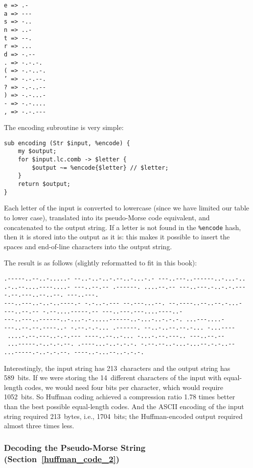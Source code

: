 \begin{verbatim}
e => .-
a => ---
s => -..
n => ..-
t => --.
r => ...
d => -.--
. => -.-.-.
( => -.-..-.
’ => -.-.--.
? => -.-..--
) => -.-...-
- => -.-....
, => -.-.---
\end{verbatim}

The encoding subroutine is very simple:

\begin{verbatim}
sub encoding (Str $input, %encode) {
    my $output;
    for $input.lc.comb -> $letter {
        $output ~= %encode{$letter} // $letter;
    }
    return $output;
}
\end{verbatim}

Each letter of the input is converted to lowercase (since we have 
limited our table to lower case), translated into its pseudo-Morse 
code equivalent, and concatenated to the output string. If a letter
is not found in the \verb'%encode' hash, then it is stored into 
the output as it is: this makes it possible to insert the spaces 
and end-of-line characters into the output string.

The result is as follows (slightly reformatted to fit in this book):
\begin{verbatim}
.-----..--..-.....- --..-..-..-.--..-...-.- ---..---..------..-...-..
.-..--....----....- ---..--.-- .------. ....--.-- ---..---.-..-.-.---
-.--.---..--..--. ---..---.
---..---..-..-..----.- -.-..-.--- --.---...--. --.----..--..--.-...- 
---..--.-- -.--....-----.-- ---..---.---....----..-
---..---..------..-...-.-.....------..-...-..-.-.-. ...---....-
---..--.--.----..- -.--.-.-... .------. --..-..--.--.-... -...----
 ....-.--.---..-.-.--- ----..--..-... -...-.--.---.. ---..--.-- 
 ...-----.-..-.-.--. .----...-..-.-.-. -.--.--..-...-...--.-.-..--
...-----.-..-.-.--. ----..-...--..-.-.-.
\end{verbatim}

Interestingly, the input string has 213~characters and the output 
string has 589~bits. If we were storing the 14~different characters of 
the input with equal-length codes, we would need four bits per 
character, which would require 1052~bits. So Huffman coding 
achieved a compression ratio 1.78 times better than the best possible 
equal-length codes. And the ASCII encoding of the input string 
required 213~bytes, i.e., 1704~bits; the Huffman-encoded output 
required almost three times less. 

\subsubsection{Decoding the Pseudo-Morse String (Section~\ref{huffman_code_2})}

